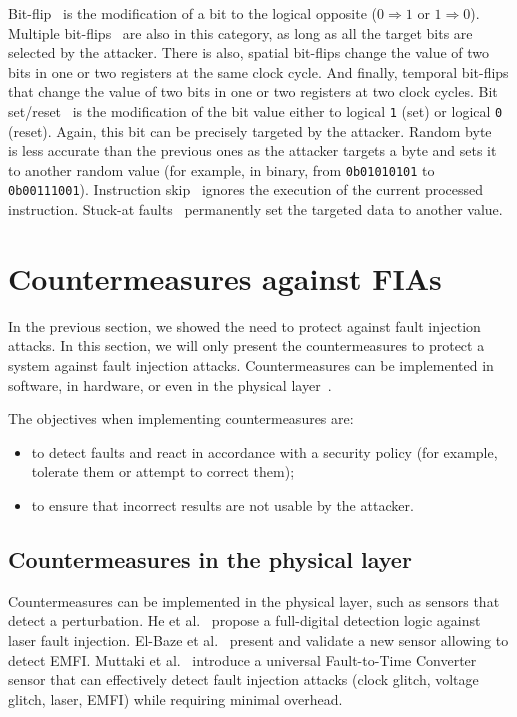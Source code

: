Bit-flip~\cite{CMDMRD-19-host} is the modification of a bit to the logical opposite ($0 \Rightarrow 1$ or $1 \Rightarrow 0$).
Multiple bit-flips~\cite{CGVCBLC-22-cardis} are also in this category, as long as all the target bits are selected by the attacker.
There is also, spatial bit-flips change the value of two bits in one or two registers at the same clock cycle.
And finally, temporal bit-flips that change the value of two bits in one or two registers at two clock cycles.
Bit set/reset~\cite{BS-03-financialcrypto} is the modification of the bit value either to logical \texttt{1} (set) or logical \texttt{0} (reset). Again, this bit can be precisely targeted by the attacker.
Random byte~\cite{LFZD-16-fdtc} is less accurate than the previous ones as the attacker targets a byte and sets it to another random value (for example, in binary, from \texttt{0b01010101} to \texttt{0b00111001}).
Instruction skip~\cite{MDPRD-20-dtis} ignores the execution of the current processed instruction.
Stuck-at faults~\cite{MABGHMRSYV-18-fdtc} permanently set the targeted data to another value.


\section{Countermeasures against FIAs}
\label{section:countermeasuresAgainstFIA}
In the previous section, we showed the need to protect against fault injection attacks.
In this section, we will only present the countermeasures to protect a system against fault injection attacks.
Countermeasures can be implemented in software, in hardware, or even in the physical layer~\cite{BCNTW-06-procieee}.

The objectives when implementing countermeasures are:
\begin{itemize}
    \item to detect faults and react in accordance with a security policy (for example, tolerate them or attempt to correct them);
    \item to ensure that incorrect results are not usable by the attacker. 
\end{itemize}

\subsection{Countermeasures in the physical layer}
Countermeasures can be implemented in the physical layer, such as sensors that detect a perturbation. He et al.~\cite{HBB-16-space} propose a full-digital detection logic against laser fault injection. El-Baze et al.~\cite{ERM-16-date} present and validate a new sensor allowing to detect EMFI. Muttaki et al.~\cite{MZTF-22-host} introduce a universal Fault-to-Time Converter sensor that can effectively detect fault injection attacks (clock glitch, voltage glitch, laser, EMFI) while requiring minimal overhead.

